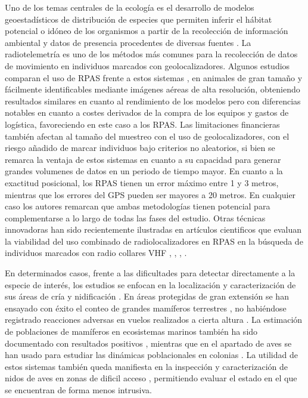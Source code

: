 \documentclass[11pt,]{article}
\begin{document}
Uno de los temas centrales de la ecología es el desarrollo de modelos
geoestadísticos de distribución de especies que permiten inferir el
hábitat potencial o idóneo de los organismos a partir de la recolección
de información ambiental y datos de presencia procedentes de diversas
fuentes \citep{Mateo2011}. La radiotelemetría es uno de los métodos más
comunes para la recolección de datos de movimiento en individuos
marcados con geolocalizadores. Algunos estudios comparan el uso de RPAS
frente a estos sistemas \citep{PazmanyMulero2015},
\citep{Mulero-Pazmany2015} en animales de gran tamaño y fácilmente
identificables mediante imágenes aéreas de alta resolución, obteniendo
resultados similares en cuanto al rendimiento de los modelos pero con
diferencias notables en cuanto a costes derivados de la compra de los
equipos y gastos de logística, favoreciendo en este caso a los RPAS. Las
limitaciones financieras también afectan al tamaño del muestreo con el
uso de geolocalizadores, con el riesgo añadido de marcar individuos bajo
criterios no aleatorios, si bien se remarca la ventaja de estos sistemas
en cuanto a su capacidad para generar grandes volumenes de datos en un
periodo de tiempo mayor. En cuanto a la exactitud posicional, los RPAS
tienen un error máximo entre 1 y 3 metros, mientras que los errores del
GPS pueden ser mayores a 20 metros. En cualquier caso los autores
remarcan que ambas metodologías tienen potencial para complementarse a
lo largo de todas las fases del estudio. Otras técnicas innovadoras han
sido recientemente ilustradas en artículos cientificos que evaluan la
viabilidad del uso combinado de radiolocalizadores en RPAS en la
búsqueda de individuos marcados con radio collares VHF
\citep{Korner2010}, \citep{Bayram2016}, \citep{Cliff2015},
\citep{Leonardo2013}.

En determinados casos, frente a las dificultades para detectar
directamente a la especie de interés, los estudios se enfocan en la
localización y caracterización de sus áreas de cría y nidificación
\citep{VanAndel2015}. En áreas protegidas de gran extensión se han
ensayado con éxito el conteo de grandes mamíferos terrestres , no
habiéndose registrado reacciones adversas en vuelos realizados a cierta
altura \citep{Vermeulen2013}. La estimación de poblaciones de mamíferos
en ecosistemas marinos también ha sido documentado con resultados
positivos \citep{Hodgson2013}, mientras que en el apartado de aves se
han usado para estudiar las dinámicas poblacionales en colonias
\citep{Sarda-Palomera2012}. La utilidad de estos sistemas también queda
manifiesta en la inspección y caracterización de nidos de aves en zonas
de dificil acceso \citep{Weissensteiner2015}, permitiendo evaluar el
estado en el que se encuentran de forma menos intrusiva.
\end{document}
